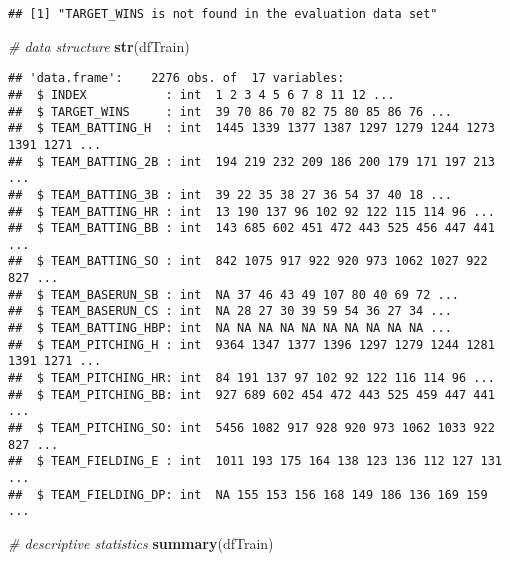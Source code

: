 \documentclass[
]{article}
\newenvironment{Shaded}{\begin{snugshade}}{\end{snugshade}}
\newcommand{\CommentTok}[1]{\textcolor[rgb]{0.56,0.35,0.01}{\textit{#1}}}
\newcommand{\KeywordTok}[1]{\textcolor[rgb]{0.13,0.29,0.53}{\textbf{#1}}}
\newcommand{\NormalTok}[1]{#1}
\begin{document}
\begin{verbatim}
## [1] "TARGET_WINS is not found in the evaluation data set"
\end{verbatim}

\begin{Shaded}
\begin{Highlighting}[]
\CommentTok{# data structure }
\KeywordTok{str}\NormalTok{(dfTrain)}
\end{Highlighting}
\end{Shaded}

\begin{verbatim}
## 'data.frame':    2276 obs. of  17 variables:
##  $ INDEX           : int  1 2 3 4 5 6 7 8 11 12 ...
##  $ TARGET_WINS     : int  39 70 86 70 82 75 80 85 86 76 ...
##  $ TEAM_BATTING_H  : int  1445 1339 1377 1387 1297 1279 1244 1273 1391 1271 ...
##  $ TEAM_BATTING_2B : int  194 219 232 209 186 200 179 171 197 213 ...
##  $ TEAM_BATTING_3B : int  39 22 35 38 27 36 54 37 40 18 ...
##  $ TEAM_BATTING_HR : int  13 190 137 96 102 92 122 115 114 96 ...
##  $ TEAM_BATTING_BB : int  143 685 602 451 472 443 525 456 447 441 ...
##  $ TEAM_BATTING_SO : int  842 1075 917 922 920 973 1062 1027 922 827 ...
##  $ TEAM_BASERUN_SB : int  NA 37 46 43 49 107 80 40 69 72 ...
##  $ TEAM_BASERUN_CS : int  NA 28 27 30 39 59 54 36 27 34 ...
##  $ TEAM_BATTING_HBP: int  NA NA NA NA NA NA NA NA NA NA ...
##  $ TEAM_PITCHING_H : int  9364 1347 1377 1396 1297 1279 1244 1281 1391 1271 ...
##  $ TEAM_PITCHING_HR: int  84 191 137 97 102 92 122 116 114 96 ...
##  $ TEAM_PITCHING_BB: int  927 689 602 454 472 443 525 459 447 441 ...
##  $ TEAM_PITCHING_SO: int  5456 1082 917 928 920 973 1062 1033 922 827 ...
##  $ TEAM_FIELDING_E : int  1011 193 175 164 138 123 136 112 127 131 ...
##  $ TEAM_FIELDING_DP: int  NA 155 153 156 168 149 186 136 169 159 ...
\end{verbatim}

\begin{Shaded}
\begin{Highlighting}[]
\CommentTok{# descriptive statistics}
\KeywordTok{summary}\NormalTok{(dfTrain)}
\end{Highlighting}
\end{Shaded}
\end{document}
